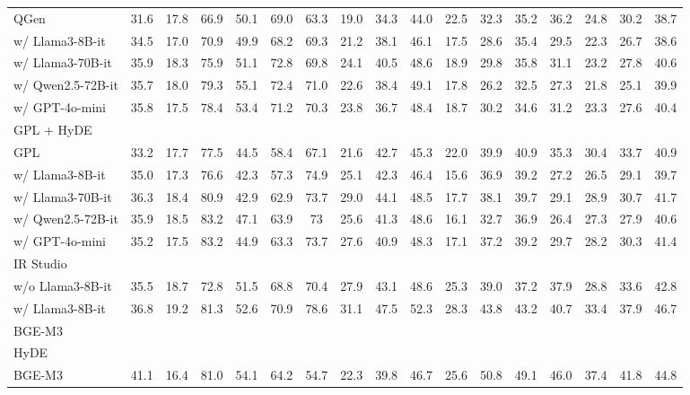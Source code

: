 \begin{table*}[ht]
{\begin{tabular}{l|ccccccccc|cccccc|c}
        QGen & 31.6 & 17.8 & 66.9 & 50.1 & 69.0 & 63.3 & 19.0 & 34.3 & 44.0 & 22.5 & 32.3 & 35.2 & 36.2 & 24.8 & 30.2 & 38.7 \\
        w/ Llama3-8B-it & 34.5 & 17.0 & 70.9 & 49.9 & 68.2 & 69.3 & 21.2 & 38.1 & 46.1 & 17.5 & 28.6 & 35.4 & 29.5 & 22.3 & 26.7 & 38.6 \\
        w/ Llama3-70B-it & 35.9 & 18.3 & 75.9 & 51.1 & 72.8 & 69.8 & 24.1 & 40.5 & 48.6 & 18.9 & 29.8 & 35.8 & 31.1 & 23.2 & 27.8 & 40.6 \\
        w/ Qwen2.5-72B-it & 35.7 & 18.0 & 79.3 & 55.1 & 72.4 & 71.0 & 22.6 & 38.4 & 49.1  & 17.8 & 26.2 & 32.5 & 27.3 & 21.8 & 25.1  & 39.9 \\
        w/ GPT-4o-mini & 35.8 & 17.5 & 78.4 & 53.4 & 71.2 & 70.3 & 23.8 & 36.7 & 48.4  & 18.7 & 30.2 & 34.6 & 31.2 & 23.3 & 27.6  & 40.4 \\
        \midrule
        \multicolumn{17}{l}{GPL + HyDE} \\
        GPL & 33.2 & 17.7 & 77.5 & 44.5 & 58.4 & 67.1 & 21.6 & 42.7 & 45.3 & 22.0 & 39.9 & 40.9 & 35.3 & 30.4 & 33.7 & 40.9 \\
        w/ Llama3-8B-it & 35.0 & 17.3 & 76.6 & 42.3 & 57.3 & 74.9 & 25.1 & 42.3 & 46.4 & 15.6 & 36.9 & 39.2 & 27.2 & 26.5 & 29.1 & 39.7 \\
        w/ Llama3-70B-it & 36.3 & 18.4 & 80.9 & 42.9 & 62.9 & 73.7 & 29.0 & 44.1 & 48.5 & 17.7 & 38.1 & 39.7 & 29.1 & 28.9 & 30.7 & 41.7 \\
        w/ Qwen2.5-72B-it & 35.9 & 18.5 & 83.2 & 47.1 & 63.9 & 73 & 25.6 & 41.3 & 48.6  & 16.1 & 32.7 & 36.9 & 26.4 & 27.3 & 27.9  & 40.6 \\
        w/ GPT-4o-mini & 35.2 & 17.5 & 83.2 & 44.9 & 63.3 & 73.7 & 27.6 & 40.9 & 48.3 & 17.1 & 37.2 & 39.2 & 29.7 & 28.2 & 30.3 & 41.4 \\
        \midrule
        \multicolumn{17}{l}{IR Studio} \\
        w/o Llama3-8B-it & 35.5 & 18.7 & 72.8 & 51.5 & 68.8 & 70.4 & 27.9 & 43.1 & 48.6 & 25.3 & 39.0 & 37.2 & 37.9 & 28.8 & 33.6 & 42.8 \\
        w/ Llama3-8B-it & 36.8 & 19.2 & 81.3 & 52.6 & 70.9 & 78.6 & 31.1 & 47.5 & 52.3 & 28.3 & 43.8 & 43.2 & 40.7 & 33.4 & 37.9 & 46.7 \\
        \midrule
        \multicolumn{17}{l}{BGE-M3} \\
        \midrule
        \multicolumn{17}{l}{HyDE} \\
        BGE-M3 & 41.1 & 16.4 & 81.0 & 54.1 & 64.2 & 54.7 & 22.3 & 39.8 & 46.7 & 25.6 & 50.8 & 49.1 & 46.0 & 37.4 & 41.8 & 44.8 \\

\end{tabular}}
\end{table*}
